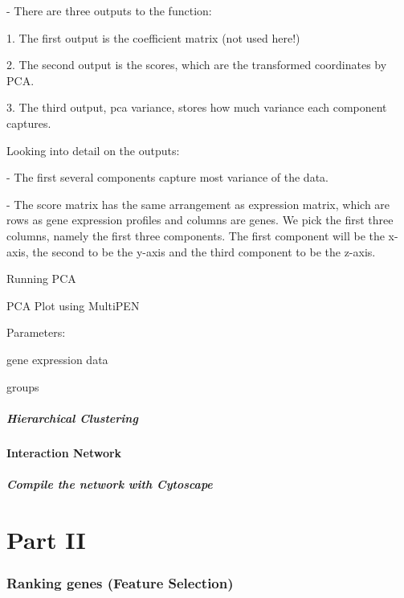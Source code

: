 \documentclass[11pt, oneside]{article}   	%
\begin{document}
- There are three outputs to the function:

1. The first output is the coefficient matrix (not used here!)

2. The second output is the scores, which are the transformed coordinates by PCA.

3. The third output, pca variance, stores how much variance each component captures.


Looking into detail on the outputs:

- The first several components capture most variance of the data.

- The score matrix has the same arrangement as expression matrix, which are rows as gene expression profiles and columns are genes. We pick the first three columns, namely the first three components. The first component will be the x-axis, the second to be the y-axis and the third component to be the z-axis.

Running PCA

%
%
%
%



PCA Plot using MultiPEN

Parameters:

gene expression data

groups



\subsubsection{Hierarchical Clustering}

\subsection{Interaction Network}
\subsubsection{Compile the network with Cytoscape}


\part{Part II}
\section{Ranking genes (Feature Selection)} 
\end{document}
